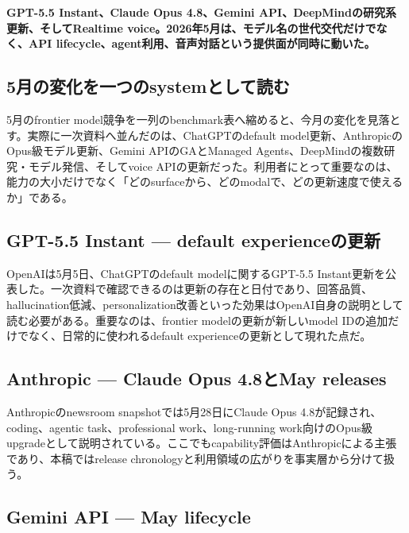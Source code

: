 \noindent\textbf{GPT-5.5 Instant、Claude Opus 4.8、Gemini API、DeepMindの研究系更新、そしてRealtime voice。2026年5月は、モデル名の世代交代だけでなく、API lifecycle、agent利用、音声対話という提供面が同時に動いた。}\autocite{src-01a8b52eee81,src-24a3c172de48,src-5c3d93bd7160,src-a24fd97eb3d0,src-dd5d9b8662f3,src-eac8dfbeb78c,src-f6aa679babd7}

\subsection{5月の変化を一つのsystemとして読む}

5月のfrontier model競争を一列のbenchmark表へ縮めると、今月の変化を見落とす。実際に一次資料へ並んだのは、ChatGPTのdefault model更新、AnthropicのOpus級モデル更新、Gemini APIのGAとManaged Agents、DeepMindの複数研究・モデル発信、そしてvoice APIの更新だった。利用者にとって重要なのは、能力の大小だけでなく「どのsurfaceから、どのmodalで、どの更新速度で使えるか」である。\autocite{src-01a8b52eee81,src-24a3c172de48,src-5c3d93bd7160,src-a24fd97eb3d0,src-dd5d9b8662f3,src-eac8dfbeb78c,src-f6aa679babd7}


\subsection{GPT-5.5 Instant — default experienceの更新}

OpenAIは5月5日、ChatGPTのdefault modelに関するGPT-5.5 Instant更新を公表した。一次資料で確認できるのは更新の存在と日付であり、回答品質、hallucination低減、personalization改善といった効果はOpenAI自身の説明として読む必要がある。重要なのは、frontier modelの更新が新しいmodel IDの追加だけでなく、日常的に使われるdefault experienceの更新として現れた点だ。\autocite{src-01a8b52eee81}


\subsection{Anthropic — Claude Opus 4.8とMay releases}

Anthropicのnewsroom snapshotでは5月28日にClaude Opus 4.8が記録され、coding、agentic task、professional work、long-running work向けのOpus級upgradeとして説明されている。ここでもcapability評価はAnthropicによる主張であり、本稿ではrelease chronologyと利用領域の広がりを事実層から分けて扱う。\autocite{src-f6aa679babd7}


\subsection{Gemini API — May lifecycle}

